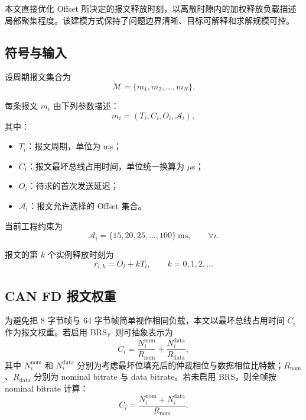 \documentclass[UTF8,12pt,a4paper]{ctexart}
\newcommand{\Oset}{\mathcal{A}}
\newcommand{\Mset}{\mathcal{M}}
\begin{document}
本文直接优化 Offset 所决定的报文释放时刻，以离散时隙内的加权释放负载描述局部聚集程度。该建模方式保持了问题边界清晰、目标可解释和求解规模可控。

\subsection{符号与输入}

设周期报文集合为
\begin{equation}
\Mset=\{m_1,m_2,\ldots,m_N\}.
\end{equation}

每条报文 $m_i$ 由下列参数描述：
\begin{equation}
 m_i=(T_i,C_i,O_i,\Oset_i),
\end{equation}
其中：

\begin{itemize}
  \item $T_i$：报文周期，单位为 ms；
  \item $C_i$：报文最坏总线占用时间，单位统一换算为 $\mu$s；
  \item $O_i$：待求的首次发送延迟；
  \item $\Oset_i$：报文允许选择的 Offset 集合。
\end{itemize}

当前工程约束为
\begin{equation}
\Oset_i=\{15,20,25,\ldots,100\}\ \mathrm{ms},\qquad \forall i.
\label{eq:offset-set}
\end{equation}

报文的第 $k$ 个实例释放时刻为
\begin{equation}
 r_{i,k}=O_i+kT_i,\qquad k=0,1,2,\ldots
\label{eq:release}
\end{equation}

\subsection{CAN FD 报文权重}

为避免把 8 字节帧与 64 字节帧简单视作相同负载，本文以最坏总线占用时间 $C_i$ 作为报文权重。若启用 BRS，则可抽象表示为
\begin{equation}
 C_i=\frac{N^{\mathrm{nom}}_i}{R_{\mathrm{nom}}}
     +\frac{N^{\mathrm{data}}_i}{R_{\mathrm{data}}},
\label{eq:frame-time-brs}
\end{equation}
其中 $N^{\mathrm{nom}}_i$ 和 $N^{\mathrm{data}}_i$ 分别为考虑最坏位填充后的仲裁相位与数据相位比特数；$R_{\mathrm{nom}}$、$R_{\mathrm{data}}$ 分别为 nominal bitrate 与 data bitrate。若未启用 BRS，则全帧按 nominal bitrate 计算：
\begin{equation}
 C_i=\frac{N^{\mathrm{nom}}_i+N^{\mathrm{data}}_i}{R_{\mathrm{nom}}}.
\label{eq:frame-time-no-brs}
\end{equation}
\end{document}
